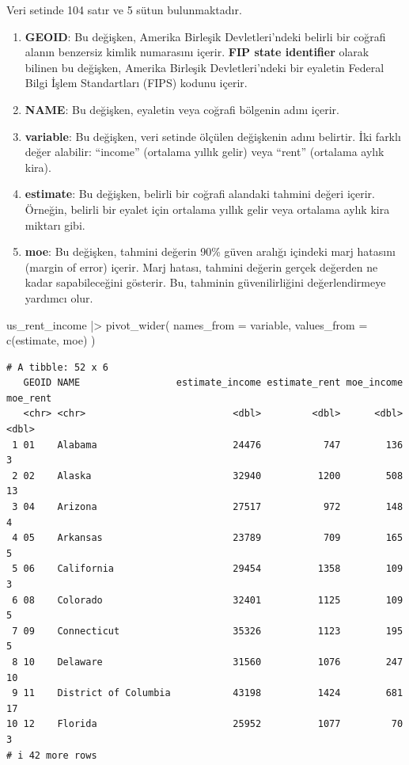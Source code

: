 \documentclass[
  letterpaper,
  DIV=11,
  numbers=noendperiod]{scrreprt}
\newenvironment{Shaded}{\begin{snugshade}}{\end{snugshade}}
\newcommand{\AttributeTok}[1]{\textcolor[rgb]{0.40,0.45,0.13}{#1}}
\newcommand{\FunctionTok}[1]{\textcolor[rgb]{0.28,0.35,0.67}{#1}}
\newcommand{\NormalTok}[1]{\textcolor[rgb]{0.00,0.23,0.31}{#1}}
\newcommand{\SpecialCharTok}[1]{\textcolor[rgb]{0.37,0.37,0.37}{#1}}
\begin{document}
Veri setinde 104 satır ve 5 sütun bulunmaktadır.

\begin{enumerate}
\def\labelenumi{\arabic{enumi}.}
\item
  \textbf{GEOID}: Bu değişken, Amerika Birleşik Devletleri'ndeki belirli
  bir coğrafi alanın benzersiz kimlik numarasını içerir. \textbf{FIP
  state identifier} olarak bilinen bu değişken, Amerika Birleşik
  Devletleri'ndeki bir eyaletin Federal Bilgi İşlem Standartları (FIPS)
  kodunu içerir.
\item
  \textbf{NAME}: Bu değişken, eyaletin veya coğrafi bölgenin adını
  içerir.
\item
  \textbf{variable}: Bu değişken, veri setinde ölçülen değişkenin adını
  belirtir. İki farklı değer alabilir: ``income'' (ortalama yıllık
  gelir) veya ``rent'' (ortalama aylık kira).
\item
  \textbf{estimate}: Bu değişken, belirli bir coğrafi alandaki tahmini
  değeri içerir. Örneğin, belirli bir eyalet için ortalama yıllık gelir
  veya ortalama aylık kira miktarı gibi.
\item
  \textbf{moe}: Bu değişken, tahmini değerin 90\% güven aralığı içindeki
  marj hatasını (margin of error) içerir. Marj hatası, tahmini değerin
  gerçek değerden ne kadar sapabileceğini gösterir. Bu, tahminin
  güvenilirliğini değerlendirmeye yardımcı olur.
\end{enumerate}

\begin{Shaded}
\begin{Highlighting}[]
\NormalTok{us\_rent\_income }\SpecialCharTok{|\textgreater{}} 
  \FunctionTok{pivot\_wider}\NormalTok{(}
    \AttributeTok{names\_from =}\NormalTok{ variable,}
    \AttributeTok{values\_from =} \FunctionTok{c}\NormalTok{(estimate, moe)}
\NormalTok{  )}
\end{Highlighting}
\end{Shaded}

\begin{verbatim}
# A tibble: 52 x 6
   GEOID NAME                 estimate_income estimate_rent moe_income moe_rent
   <chr> <chr>                          <dbl>         <dbl>      <dbl>    <dbl>
 1 01    Alabama                        24476           747        136        3
 2 02    Alaska                         32940          1200        508       13
 3 04    Arizona                        27517           972        148        4
 4 05    Arkansas                       23789           709        165        5
 5 06    California                     29454          1358        109        3
 6 08    Colorado                       32401          1125        109        5
 7 09    Connecticut                    35326          1123        195        5
 8 10    Delaware                       31560          1076        247       10
 9 11    District of Columbia           43198          1424        681       17
10 12    Florida                        25952          1077         70        3
# i 42 more rows
\end{verbatim}
\end{document}

